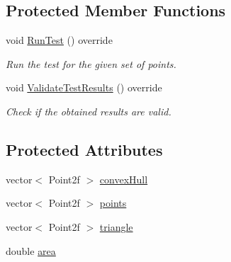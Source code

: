 \subsection*{\-Protected \-Member \-Functions}
\begin{DoxyCompactItemize}
\item 
void \hyperlink{classmultiscaletest_1_1MinEnclosingTriangleFinderTest_a9a0c1dfbe0e0b2451b1c4076967f47d9}{\-Run\-Test} () override
\begin{DoxyCompactList}\small\item\em \-Run the test for the given set of points. \end{DoxyCompactList}\item 
void \hyperlink{classmultiscaletest_1_1MinEnclosingTriangleFinderTest_ab5dd9317ad241d04c8338602c09036fe}{\-Validate\-Test\-Results} () override
\begin{DoxyCompactList}\small\item\em \-Check if the obtained results are valid. \end{DoxyCompactList}\end{DoxyCompactItemize}
\subsection*{\-Protected \-Attributes}
\begin{DoxyCompactItemize}
\item 
vector$<$ \-Point2f $>$ \hyperlink{classmultiscaletest_1_1MinEnclosingTriangleFinderTest_a309e2484e202fab797520fc15517d95d}{convex\-Hull}
\item 
vector$<$ \-Point2f $>$ \hyperlink{classmultiscaletest_1_1MinEnclosingTriangleFinderTest_ace108c67a933a0d79c05b304a9683764}{points}
\item 
vector$<$ \-Point2f $>$ \hyperlink{classmultiscaletest_1_1MinEnclosingTriangleFinderTest_a02aa9bcd10630d27293e656233e3f64e}{triangle}
\item 
double \hyperlink{classmultiscaletest_1_1MinEnclosingTriangleFinderTest_a80c049e5307e5f316ad0b73964ea90bf}{area}
\end{DoxyCompactItemize}
